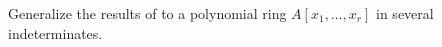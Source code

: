 \begin{exercise}
Generalize the results of  to a polynomial ring \(A[x_1,\ldots,x_r]\) in several indeterminates.
\end{exercise}